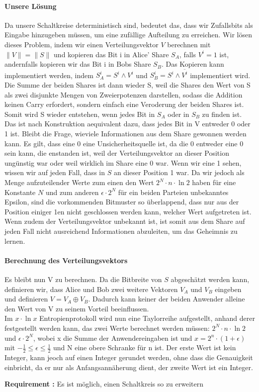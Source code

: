 \documentclass{article}
\newcounter{requirementscount}{}
\newcommand{\requirement}[1] {
        \addtocounter{requirementscount}{1}
        {\bf Requirement \therequirementscount:} #1\\
    }
\begin{document}
\paragraph{Unsere L\"osung}
Da unsere
Schaltkreise deterministisch sind, bedeutet das, dass wir Zufallsbits als 
Eingabe hinzugeben m\"ussen, um eine zuf\"allige Aufteilung zu erreichen.
Wir l\"osen dieses Problem, indem wir einen Verteilungsvektor \(V\)
berechnen mit \(\|V\| = \|S\|\) und kopieren das Bit i in Alice' Share \(S_A\),
falls \(V^i = 1\) ist, andernfalls kopieren wir das Bit i in Bobs Share \(S_B\).
Das Kopieren kann implementiert werden, indem \(S_A^i = S^i \wedge V^i\) und
\(S_B^i = S^i \wedge \overline{V^i}\) implementiert wird.
Die Summe der beiden Shares ist dann wieder S, weil die Shares den Wert von
S als zwei disjunkte Mengen von Zweierpotenzen darstellen, sodass die Addition
keinen Carry erfordert, sondern einfach eine Veroderung der beiden Shares ist.
Somit wird S wieder entstehen, wenn jedes Bit in \(S_A\) oder in \(S_B\) zu
finden ist. Das ist nach Konstruktion aequivalent dazu, dass jedes Bit in V
entweder 0 oder 1 ist. Bleibt die Frage, wieviele Informationen aus dem Share
gewonnen werden kann. Es gilt, dass eine 0 eine Unsicherheitsquelle ist, da
die 0 entweder eine 0 sein kann, die enstanden ist, weil der Verteilungsvektor
an dieser Position ung\"unstig war oder weil wirklich im Share eine 0 war.
Wenn wir eine 1 sehen, wissen wir auf jeden Fall, dass in \(S\) an dieser
Position 1 war. Da wir jedoch als Menge aufzuteilender Werte zum einen den
Wert \(2^N \cdot n \cdot \ln 2\) haben f\"ur eine Konstante \(N\) und zum
anderen \(\epsilon \cdot 2^N\) f\"ur ein beiden Parteien unbekanntes
Epsilon, sind die vorkommenden Bitmuster so \"uberlappend, dass nur aus der
Position einiger 1en nicht geschlossen werden kann, welcher Wert aufgetreten 
ist. Wenn zudem der Verteilungsvektor unbekannt ist, ist somit aus dem Share
auf jeden Fall nicht ausreichend Informationen abzuleiten, um das Geheimnis
zu lernen.

\paragraph{Berechnung des Verteilungsvektors}
Es bleibt nun V zu berechnen. Da die Bitbreite von \(S\) abgesch\"atzt werden
kann, definieren wir, dass Alice und Bob zwei weitere Vektoren \(V_A\) und
\(V_B\) eingeben und definieren \(V = V_A \oplus V_B\). Dadurch kann keiner
der beiden Anwender alleine den Wert von V zu seinem Vorteil beeinflussen.\\
Im \(x \cdot \ln x\) Entropienprotokoll wird nun eine Taylorreihe aufgestellt,
anhand derer festgestellt werden kann, das zwei Werte berechnet werden m\"ussen:
\(2^N \cdot n \cdot \ln 2\) und \(\epsilon \cdot 2^N\), wobei x die
Summe der Anwendereingaben ist und \(x = 2^n\cdot(1+\epsilon)\) mit 
\(-\frac{1}{2} \leq \epsilon \leq \frac{1}{2}\) und N eine obere Schranke
f\"ur n ist. Der erste Wert ist kein Integer, kann jeoch auf einen Integer
gerundet werden, ohne dass die Genauigkeit einbricht, da er nur als
Anfangsann\"aherung dient, der zweite Wert ist ein Integer.
\requirement{Es ist m\"oglich, einen Schaltkreis so zu erweitern}
\end{document}
